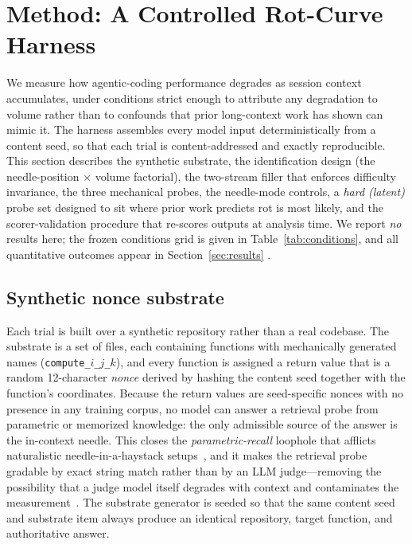 \documentclass[11pt]{article}
\providecommand{\resultplaceholder}{}
\renewcommand{\resultplaceholder}{}
\begin{document}
\section{Method: A Controlled Rot-Curve Harness}
\label{sec:method}

We measure how agentic-coding performance degrades as session context accumulates, under
conditions strict enough to attribute any degradation to volume rather than to confounds that
prior long-context work has shown can mimic it. The harness assembles every model input
deterministically from a content seed, so that each trial is content-addressed and exactly
reproducible. This section describes the synthetic substrate, the identification design (the
needle-position $\times$ volume factorial), the two-stream filler that enforces difficulty
invariance, the three mechanical probes, the needle-mode controls, a \emph{hard (latent)} probe
set designed to sit where prior work predicts rot is most likely, and the scorer-validation
procedure that re-scores outputs at analysis time. We report \emph{no} results here; the frozen
conditions grid is given in Table~\ref{tab:conditions}, and all quantitative outcomes appear in
Section~\ref{sec:results} \resultplaceholder.

\subsection{Synthetic nonce substrate}
\label{sec:method:substrate}

Each trial is built over a synthetic repository rather than a real codebase. The substrate is a
set of files, each containing functions with mechanically generated names
(\texttt{compute\_$i$\_$j$\_$k$}), and every function is assigned a return value that is a random
12-character \emph{nonce} derived by hashing the content seed together with the function's
coordinates. Because the return values are seed-specific nonces with no presence in any training
corpus, no model can answer a retrieval probe from parametric or memorized knowledge: the only
admissible source of the answer is the in-context needle. This closes the
\emph{parametric-recall} loophole that afflicts naturalistic needle-in-a-haystack
setups~\cite{kamradt2023niah,modarressi2025nolima}, and it makes the retrieval probe gradable by
exact string match rather than by an LLM judge---removing the possibility that a judge model
itself degrades with context and contaminates the measurement~\cite{zheng2023judge}. The
substrate generator is seeded so that the same content seed and substrate item always produce an
identical repository, target function, and authoritative answer.
\end{document}
